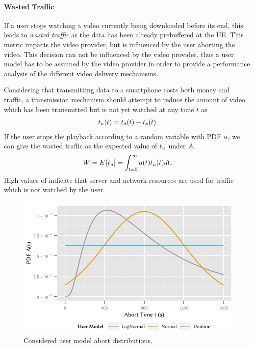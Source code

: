 \paragraph*{Wasted Traffic}
If a user stops watching a video currently being downloaded before its end, this leads to \emph{wasted traffic} as the data has been already prebuffered at the \gls{UE}.
This metric impacts the video provider, but is influenced by the user aborting the video.
This decision can not be influenced by the video provider, thus a user model has to be assumed by the video provider in order to provide a performance analysis of the different video delivery mechanisms.

Considering that transmitting data to a smartphone costs both money and traffic, a transmission mechanism should attempt to reduce the amount of video which has been transmitted but is not yet watched at any time \(t\) as 
\[t_u(t) = t_d(t) - t_p(t)\]
If the user stops the playback according to a random variable \userabortrv with \gls{PDF} \(a\), we can give the wasted traffic \meanwastedtraffic as the expected value of $t_u$ under $A$.
\begin{equation}
W = E\left[t_u\right] = \int_{t=0}^{\infty} a(t) t_u(t) d\mathrm{t}.
\end{equation}
High values of \meanwastedtraffic indicate that server and network resources are used for traffic which is not watched by the user.

\begin{figure}
\begin{center}
  \includegraphics{application/lte_video/system_model/figures/abort_distributions}
  \caption{Considered user model abort distributions.}
  \label{fig:application:lte_video:system_model:model_assumptions:metrics:abort_distributions}
\end{center}
\end{figure}

